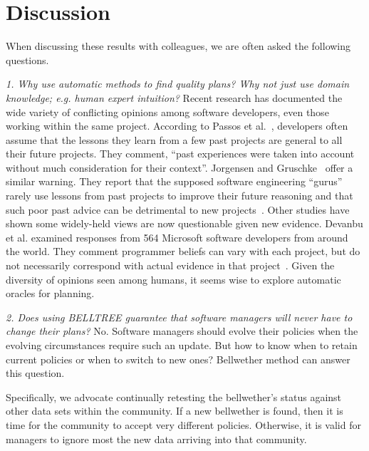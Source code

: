 \section{Discussion}
\label{sect:discuss}
When discussing these results with colleagues, we are often asked the following questions.

\textit{1. Why use automatic methods to find quality plans? Why not just use domain knowledge; e.g. human expert intuition?} Recent research has documented the wide variety of conflicting opinions among software developers, even those working within the same project. According to Passos et al.~\citep{passos11}, developers often assume that the lessons they learn from a few past projects are general to all their future projects. They comment, ``past experiences were taken into account without
much consideration for their context''. Jorgensen and Gruschke~\citep{jorgensen09} offer a similar warning. They report that the supposed software engineering ``gurus'' rarely use lessons from past projects to improve their future reasoning and that such poor past advice can be detrimental to new projects~\citep{jorgensen09}. Other studies have shown some widely-held views are now questionable given new evidence. Devanbu et al. examined responses from 564 Microsoft software developers from around the world. They comment programmer beliefs can vary with each project, but do not necessarily correspond with actual evidence in that project~\citep{prem16}. Given the diversity of opinions seen among humans, it seems wise to explore automatic oracles for planning.

\textit{2. Does using BELLTREE guarantee that software managers will never have to change their plans?} No. Software managers should evolve their policies when the evolving circumstances require such an update. But how to know when to retain current policies or when to switch to new ones? Bellwether method can answer this question.

Specifically, we advocate continually retesting the bellwether's status against other data sets within the community. If a new bellwether is found, then it is time for the community to accept very different policies. Otherwise, it is valid for managers to ignore most the new data arriving into that community.

